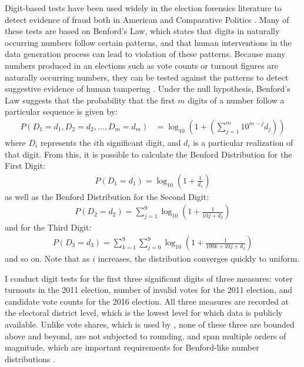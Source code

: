 \documentclass[12pt]{article}\usepackage[]{graphicx}\usepackage[]{color}
\newcommand{\1}{\mathbbm{1}}
\renewcommand\r{\right}
\renewcommand\l{\left}
\begin{document}
Digit-based tests have been used widely in the election forensics literature to detect evidence of fraud both in American \citep{Mebane2006} and Comparative Politics \citep{Mebane2009, Beber2012}. Many of these tests are based on Benford's Law, which states that digits in naturally occurring numbers follow certain patterns, and that human interventions in the data generation process can lead to violation of these patterns. Because many numbers produced in an elections such as vote counts or turnout figures are naturally occurring numbers, they can be tested against the patterns to detect suggestive evidence of human tampering \citep{Mebane2006}. Under the null hypothesis, Benford's Law suggests that the probability that the first $m$ digits of a number follow a particular sequence is given by:
\begin{align*}
P(D_1=d_1, D_2=d_2, \dots, D_m=d_m) &= \log_{10}\l(1 + \l( \sum_{j=1}^{m}10^{m-j}d_j\r)\r)
\end{align*}
where $D_i$ represents the $i$th significant digit, and $d_i$ is a particular realization of that digit. From this, it is possible to calculate the Benford Distribution for the First Digit:
\begin{align*}
	P(D_1=d_1) = \log_{10}\l(1 + \frac{1}{d_1}\r)
\end{align*}
as well as the Benford Distribution for the Second Digit:
\begin{align*}
	P(D_2=d_2) = \sum_{j=1}^{9}\log_{10}\l(1 + \frac{1}{10j + d_2}\r)
\end{align*}
and for the Third Digit:
\begin{align*}
	P(D_3=d_3) = \sum_{k=1}^{9}\sum_{j=0}^{9}\log_{10}\l(1 + \frac{1}{100k + 10j + d_3}\r)
\end{align*}
and so on. Note that as $i$ increases, the distribution converges quickly to uniform.

I conduct digit tests for the first three significant digits of three measures: voter turnouts in the 2011 election, number of invalid votes for the 2011 election, and candidate vote counts for the 2016 election. All three measures are recorded at the electoral district level, which is the lowest level for which data is publicly available. Unlike vote shares, which is used by \citep{MaleskySchuler2011}, none of these three are bounded above and beyond, are not subjected to rounding, and span multiple orders of magnitude, which are important requirements for Benford-like number distributions \citep{Hill1995, Mebane2006, Berger2015}.
\end{document}
